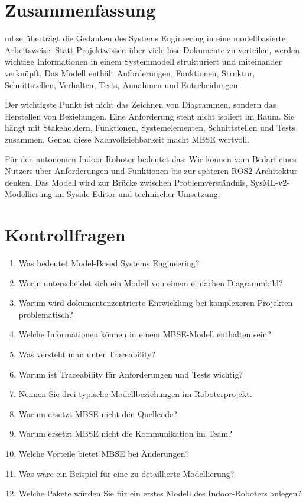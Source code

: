 \section{Zusammenfassung}
\gls{mbse} überträgt die Gedanken des Systems Engineering in eine modellbasierte Arbeitsweise. Statt Projektwissen über viele lose Dokumente zu verteilen, werden wichtige Informationen in einem Systemmodell strukturiert und miteinander verknüpft. Das Modell enthält Anforderungen, Funktionen, Struktur, Schnittstellen, Verhalten, Tests, Annahmen und Entscheidungen.

Der wichtigste Punkt ist nicht das Zeichnen von Diagrammen, sondern das Herstellen von Beziehungen. Eine Anforderung steht nicht isoliert im Raum. Sie hängt mit Stakeholdern, Funktionen, Systemelementen, Schnittstellen und Tests zusammen. Genau diese Nachvollziehbarkeit macht MBSE wertvoll.

Für den autonomen Indoor-Roboter bedeutet das: Wir können vom Bedarf eines Nutzers über Anforderungen und Funktionen bis zur späteren ROS2-Architektur denken. Das Modell wird zur Brücke zwischen Problemverständnis, SysML-v2-Modellierung im Syside Editor und technischer Umsetzung.

\section{Kontrollfragen}
\begin{enumerate}
    \item Was bedeutet Model-Based Systems Engineering?
    \item Worin unterscheidet sich ein Modell von einem einfachen Diagrammbild?
    \item Warum wird dokumentenzentrierte Entwicklung bei komplexeren Projekten problematisch?
    \item Welche Informationen können in einem MBSE-Modell enthalten sein?
    \item Was versteht man unter Traceability?
    \item Warum ist Traceability für Anforderungen und Tests wichtig?
    \item Nennen Sie drei typische Modellbeziehungen im Roboterprojekt.
    \item Warum ersetzt MBSE nicht den Quellcode?
    \item Warum ersetzt MBSE nicht die Kommunikation im Team?
    \item Welche Vorteile bietet MBSE bei Änderungen?
    \item Was wäre ein Beispiel für eine zu detaillierte Modellierung?
    \item Welche Pakete würden Sie für ein erstes Modell des Indoor-Roboters anlegen?
\end{enumerate}

